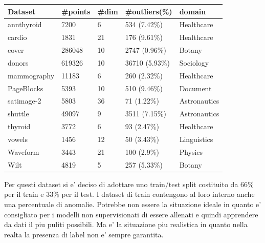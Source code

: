\begin{tabular}{|l|l|l|l|l|}
\hline
\textbf{Dataset} & \textbf{\#points} & \textbf{\#dim} & \textbf{\#outliers(\%)} & \textbf{domain} \\ \hline
annthyroid       & 7200              & 6              & 534 (7.42\%)            & Healthcare      \\ \hline
cardio           & 1831              & 21             & 176 (9.61\%)            & Healthcare      \\ \hline
cover            & 286048            & 10             & 2747 (0.96\%)           & Botany          \\ \hline
donors           & 619326            & 10             & 36710 (5.93\%)          & Sociology       \\ \hline
mammography      & 11183             & 6              & 260 (2.32\%)            & Healthcare      \\ \hline
PageBlocks       & 5393              & 10             & 510 (9.46\%)            & Document        \\ \hline
satimage-2       & 5803              & 36             & 71 (1.22\%)             & Astronautics    \\ \hline
shuttle          & 49097             & 9              & 3511 (7.15\%)           & Astronautics    \\ \hline
thyroid          & 3772              & 6              & 93 (2.47\%)             & Healthcare      \\ \hline
vowels           & 1456              & 12             & 50 (3.43\%)             & Linguistics     \\ \hline
Waveform         & 3443              & 21             & 100 (2.9\%)             & Physics         \\ \hline
Wilt             & 4819              & 5              & 257 (5.33\%)            & Botany          \\ \hline
\end{tabular}


Per questi dataset si e' deciso di adottare uno train/test split costituito da 66\% per il train e 33\% per il test. I dataset di train contengono al loro interno anche una percentuale di anomalie. Potrebbe non essere la situazione ideale in quanto e' consigliato per i modelli non supervisionati di essere allenati e quindi apprendere da dati il piu puliti possibili. Ma e' la situazione piu realistica in quanto nella realta la presenza di label non e' sempre garantita.  

